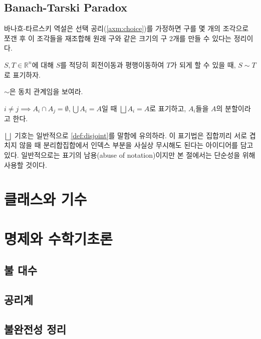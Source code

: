 \section{Banach-Tarski Paradox}
바나흐-타르스키 역설은 선택 공리(\cref{axm:choice})를 가정하면 구를 몇 개의 조각으로 쪼갠 후 이 조각들을 재조합해 원래 구와 같은 크기의 구 2개를 만들 수 있다는 정리이다.
\begin{definition}
    $S, T\in \mathbb{R}^n$에 대해 $S$를 적당히 회전이동과 평행이동하여 $T$가 되게 할 수 있을 때, $S\sim T$로 표기하자. 
\end{definition}
\begin{exercise}
    $\sim$은 동치 관계임을 보여라. 
\end{exercise}
\begin{definition}
    $i\neq j \implies A_i\cap A_j=\emptyset, \bigcup A_i=A$일 때 $\bigsqcup A_i=A$로 표기하고, $A_i$들을 $A$의 분할이라고 한다. 
\end{definition}
\begin{remark}
$\bigsqcup$ 기호는 일반적으로 \cref{def:disjoint}를 말함에 유의하라. 이 표기법은 집합끼리 서로 겹치지 않을 때 분리합집합에서 인덱스 부분을 사실상 무시해도 된다는 아이디어를 담고 있다. 
일반적으로는 표기의 남용(abuse of notation)이지만 본 절에서는 단순성을 위해 사용할 것이다. 
\end{remark}
\begin{definition}
    
\end{definition}
\begin{theorem}\label{thm:b-t}
    
\end{theorem}

\chapter{클래스와 기수} %

\chapter{명제와 수학기초론}
\section{불 대수}
\section{공리계}
\section{불완전성 정리}